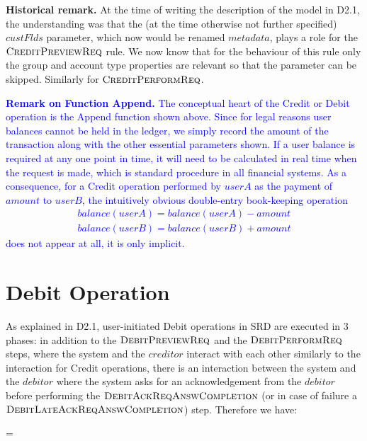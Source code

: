 {\bf Historical remark.} At the time of writing the description of the model in D2.1, the understanding was that the (at the time otherwise not further specified) $custFlds$ parameter, which now would be renamed $metadata$, plays a role for the $\hbox{\sc CreditPreviewReq}$ rule. We now know that for the behaviour of this rule only the group and account type properties are relevant so that the parameter can be skipped. Similarly for $\hbox{\sc CreditPerformReq}$.

\textcolor{blue}{
{\bf Remark on Function Append.} The conceptual heart of the Credit or Debit operation is the Append function shown above. Since for legal reasons user balances cannot be held in the ledger, we simply record the amount of the transaction along with the other essential parameters shown. If a user balance is required at any one point in time, it will need to be calculated in real time when the request is made, which is standard procedure in all financial systems. As a consequence, for a Credit operation performed by $userA$ as the payment of $amount$ to $userB$, the intuitively obvious double-entry book-keeping operation
\begin{align*}
balance(userA) = balance(userA) - amount \\
balance(userB) = balance(userB) + amount
\end{align*}
does not appear at all, it is only implicit.
}


\section{Debit Operation} 
\label{sect:debitops}

As explained in D2.1, user-initiated Debit operations in SRD are executed in 3 phases: in addition to the $\hbox{\sc DebitPreviewReq}$ and the $\hbox{\sc DebitPerformReq}$ steps, where the system and the $creditor$ interact with each other similarly to the interaction for Credit operations, there is an interaction between the system and the $debitor$ where the system asks for an acknowledgement from the $debitor$ before performing the $\hbox{\sc DebitAckReqAnswCompletion}$ (or in case of failure a $\hbox{\sc DebitLateAckReqAnswCompletion}$) step. Therefore we have:

\begin{asm}
=\+
    \\
    \\
   \\
\end{asm}

